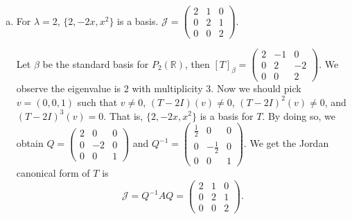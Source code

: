 \begin{Exercise}
	\begin{enumerate}[(a)]
		\item
		\begin{answer}
			For $\lambda = 2$, $\{2,-2x,x^2\}$ is a basis. $\mathcal{J} = \begin{pmatrix}
			2 & 1 & 0 \\
			0 & 2 & 1 \\
			0 & 0 & 2
			\end{pmatrix}$.
		\end{answer}
		\begin{solution}
			Let $\beta$ be the standard basis for $P_2(\mathbb{R})$, then $[T]_{\beta} = \begin{pmatrix}
			2 & -1 & 0 \\
			0 & 2 & -2 \\
			0 & 0 & 2
			\end{pmatrix}$. We observe the eigenvalue is $2$ with multiplicity $3$. Now we should pick $v = (0,0,1)$ such that $v\neq 0$, $(T-2I)(v) \neq 0$, $(T-2I)^2(v) \neq 0$, and $(T-2I)^3(v) = 0$. That is, $\{2,-2x,x^2\}$ is a basis for $T$. By doing so, we obtain $Q = \begin{pmatrix}
			2 & 0 & 0 \\
			0 & -2 & 0 \\
			0 & 0 & 1
			\end{pmatrix}$ and $Q^{-1} = \begin{pmatrix}
			\frac{1}{2} & 0 & 0 \\
			0 & -\frac{1}{2} & 0 \\
			0 & 0 & 1
			\end{pmatrix}$. We get the Jordan canonical form of $T$ is $$
			\mathcal{J} = Q^{-1} A Q = \begin{pmatrix}
			2 & 1 & 0 \\
			0 & 2 & 1 \\
			0 & 0 & 2
			\end{pmatrix}.
			$$
		\end{solution}
	\end{enumerate}
\end{Exercise}